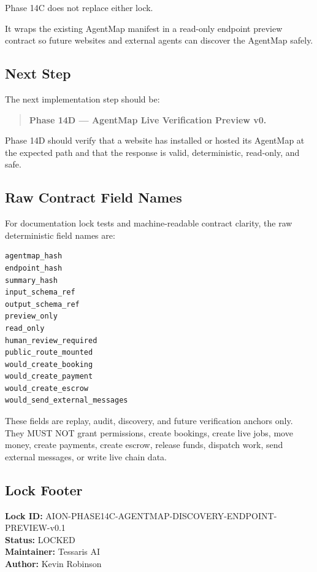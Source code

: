\documentclass[11pt]{article}
\begin{document}
Phase 14C does not replace either lock.

It wraps the existing AgentMap manifest in a read-only endpoint preview contract so future websites and external agents can discover the AgentMap safely.

\subsection{Next Step}

The next implementation step should be:

\begin{quote}
\textbf{Phase 14D --- AgentMap Live Verification Preview v0.}
\end{quote}

Phase 14D should verify that a website has installed or hosted its AgentMap at the expected path and that the response is valid, deterministic, read-only, and safe.



\subsection{Raw Contract Field Names}

For documentation lock tests and machine-readable contract clarity, the raw deterministic field names are:

\begin{verbatim}
agentmap_hash
endpoint_hash
summary_hash
input_schema_ref
output_schema_ref
preview_only
read_only
human_review_required
public_route_mounted
would_create_booking
would_create_payment
would_create_escrow
would_send_external_messages
\end{verbatim}

These fields are replay, audit, discovery, and future verification anchors only. They MUST NOT grant permissions, create bookings, create live jobs, move money, create payments, create escrow, release funds, dispatch work, send external messages, or write live chain data.

\subsection{Lock Footer}

\bigskip
\noindent\textbf{Lock ID:} AION-PHASE14C-AGENTMAP-DISCOVERY-ENDPOINT-PREVIEW-v0.1\\
\textbf{Status:} LOCKED\\
\textbf{Maintainer:} Tessaris AI\\
\textbf{Author:} Kevin Robinson
\end{document}
